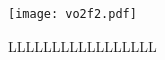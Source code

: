 \begin{figure}[H] \centering
\texttt{[image: vo2f2.pdf]}
\caption{LLLLLLLLLLLLLLLLL}
\label{fig:1}
\end{figure}
%    
%    





